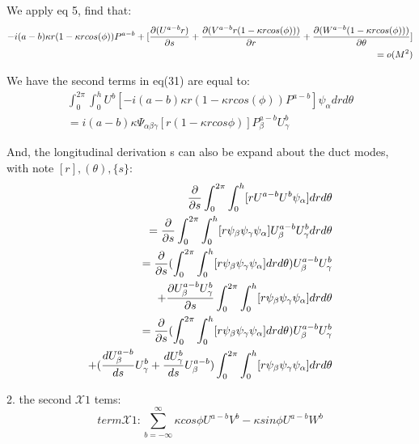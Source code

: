 \documentclass{Note}
\begin{document}
We apply eq 5, find that:
\begin{equation}
\begin{aligned}
-i(a-b)\kappa {r(1-\kappa r cos(\phi))}P^{a-b}+ [{\partial(U^{a-b} r)\over \partial s}+{\partial(V^{a-b} r(1-\kappa r cos(\phi)))\over \partial r}+{\partial(W^{a-b} (1-\kappa r cos(\phi)))\over \partial \theta}]\\
=o(M^2)
\end{aligned}
\end{equation}

We have the second terms in eq(31) are equal to:
\begin{equation}
\begin{aligned}
\int_0^{2\pi} \int_0^h U^b [-i(a-b)\kappa {r(1-\kappa r cos(\phi))}P^{a-b}]\psi_\alpha dr d\theta\\
=i(a-b)\kappa \Psi_{\alpha\beta\gamma}[r(1-\kappa r cos\phi)]P_\beta^{a-b}U_\gamma^{b}
\end{aligned}
\end{equation}

And, the longitudinal derivation s can also be expand about the duct modes, with note $[r],(\theta),\{s\}$:
\begin{equation}
\begin{aligned}
{{\partial }\over {\partial s}}\int_0^{2\pi}\int_0^h   [ {r U^{a-b}} U^b\psi_\alpha] dr d\theta\\
={{\partial }\over {\partial s}}\int_0^{2\pi}\int_0^h   [ {r \psi_\beta} \psi_\gamma \psi_\alpha]U_\beta^{a-b}U_\gamma^{b} dr d\theta\\
={{\partial }\over {\partial s}}(\int_0^{2\pi}\int_0^h   [ {r \psi_\beta} \psi_\gamma \psi_\alpha] dr d\theta)  U_\beta^{a-b}U_\gamma^{b}\\
+{{\partial U_\beta^{a-b}U_\gamma^{b}}\over {\partial s}}\int_0^{2\pi}\int_0^h   [ {r \psi_\beta} \psi_\gamma \psi_\alpha] dr d\theta\\
={{\partial }\over {\partial s}}(\int_0^{2\pi}\int_0^h   [ {r \psi_\beta} \psi_\gamma \psi_\alpha] dr d\theta)  U_\beta^{a-b}U_\gamma^{b}\\
+({{d U_\beta^{a-b} \over {d s}}U_\gamma^{b}}+{dU_\gamma^{b}\over ds}U_\beta^{a-b})\int_0^{2\pi}\int_0^h   [ {r \psi_\beta} \psi_\gamma \psi_\alpha] dr d\theta\\
\end{aligned}
\end{equation}





2. the second $\mathcal{X}1$ tems:
$$term\mathcal{X}1: \sum_{b=-\infty}^{\infty} {\kappa cos\phi }U^{a-b}V^b-{\kappa sin\phi }U^{a-b}W^b$$
\end{document}
